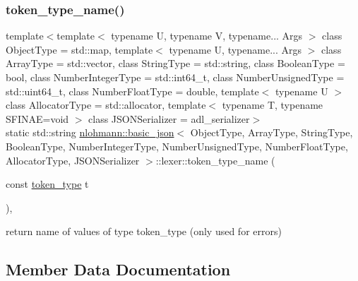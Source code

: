 \subsubsection{\texorpdfstring{token\+\_\+type\+\_\+name()}{token\_type\_name()}}
{\footnotesize\ttfamily template$<$template$<$ typename U, typename V, typename... Args $>$ class Object\+Type = std\+::map, template$<$ typename U, typename... Args $>$ class Array\+Type = std\+::vector, class String\+Type  = std\+::string, class Boolean\+Type  = bool, class Number\+Integer\+Type  = std\+::int64\+\_\+t, class Number\+Unsigned\+Type  = std\+::uint64\+\_\+t, class Number\+Float\+Type  = double, template$<$ typename U $>$ class Allocator\+Type = std\+::allocator, template$<$ typename T, typename S\+F\+I\+N\+A\+E=void $>$ class J\+S\+O\+N\+Serializer = adl\+\_\+serializer$>$ \\
static std\+::string \hyperlink{classnlohmann_1_1basic__json}{nlohmann\+::basic\+\_\+json}$<$ Object\+Type, Array\+Type, String\+Type, Boolean\+Type, Number\+Integer\+Type, Number\+Unsigned\+Type, Number\+Float\+Type, Allocator\+Type, J\+S\+O\+N\+Serializer $>$\+::lexer\+::token\+\_\+type\+\_\+name (\begin{DoxyParamCaption}\item[{const \hyperlink{classnlohmann_1_1basic__json_1_1lexer_a96887d6cd131e3d3a85a9d71fbdbcdf7}{token\+\_\+type}}]{t }\end{DoxyParamCaption})\hspace{0.3cm}{\ttfamily [inline]}, {\ttfamily [static]}}



return name of values of type token\+\_\+type (only used for errors) 



\subsection{Member Data Documentation}
\mbox{\label{classnlohmann_1_1basic__json_1_1lexer_a2ad8bad3a2224be7fdd4e4bb0f757a0e}} 
